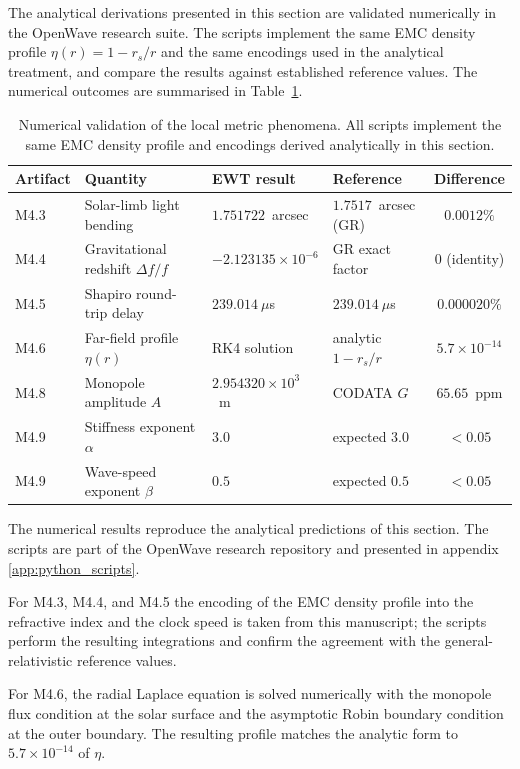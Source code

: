 \documentclass[10pt,a4paper]{article}
\begin{document}
The analytical derivations presented in this section are validated
numerically in the OpenWave research suite. The scripts implement the
same EMC density profile $\eta(r) = 1 - r_s/r$ and the same encodings
used in the analytical treatment, and compare the results against
established reference values. The numerical outcomes are summarised in
Table~\ref{tab:local_metric_validation}.

\begin{table}[h!]
	\centering
	\small
	\caption{Numerical validation of the local metric phenomena. All
		scripts implement the same EMC density profile and encodings
		derived analytically in this section.}
	\label{tab:local_metric_validation}
	\begin{tabular}{llllc}
		\toprule
		\textbf{Artifact} & \textbf{Quantity} & \textbf{EWT result} & \textbf{Reference} & \textbf{Difference} \\
		\midrule
		M4.3 & Solar-limb light bending & $1.751722$~arcsec & $1.7517$~arcsec (GR) & $0.0012\%$ \\
		M4.4 & Gravitational redshift $\Delta f/f$ & $-2.123135 \times 10^{-6}$ & GR exact factor & $0$ (identity) \\
		M4.5 & Shapiro round-trip delay & $239.014~\mu$s & $239.014~\mu$s & $0.000020\%$ \\
		M4.6 & Far-field profile $\eta(r)$ & RK4 solution & analytic $1-r_s/r$ & $5.7 \times 10^{-14}$ \\
		M4.8 & Monopole amplitude $A$ & $2.954320 \times 10^{3}$~m & CODATA $G$ & $65.65$~ppm \\
		M4.9 & Stiffness exponent $\alpha$ & $3.0$ & expected $3.0$ & $< 0.05$ \\
		M4.9 & Wave-speed exponent $\beta$ & $0.5$ & expected $0.5$ & $< 0.05$ \\
		\bottomrule
	\end{tabular}
\end{table}

The numerical results reproduce the analytical predictions of this
section. The scripts are part of the OpenWave research repository
\cite{OpenWaveM4Metric} and presented in appendix \ref{app:python_scripts}.

For M4.3, M4.4, and M4.5 the encoding of the EMC density profile into
the refractive index and the clock speed is taken from this manuscript;
the scripts perform the resulting integrations and confirm the
agreement with the general-relativistic reference values.

For M4.6, the radial Laplace equation is solved numerically with the
monopole flux condition at the solar surface and the asymptotic Robin
boundary condition at the outer boundary. The resulting profile
matches the analytic form to $5.7 \times 10^{-14}$ of $\eta$.
\end{document}

